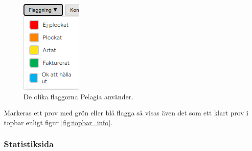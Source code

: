 \begin{figure}[H]
    \centering
    \includegraphics[width=0.2\linewidth]{images/workspace_flaggning.png}
    \caption{De olika flaggorna Pelagia använder.}
    \label{fig:workspace_flag}
\end{figure}
\noindent Markeras ett prov med grön eller blå flagga så visas även det som ett klart prov i topbar enligt figur \ref{fig:topbar_info}.

\subsubsection{Statistiksida}

\subsection{}